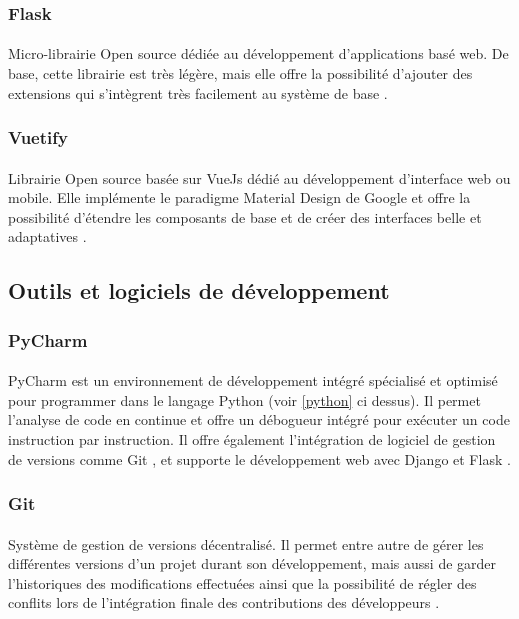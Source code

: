 		\subsubsection*{Flask}
		\paragraph{}
		Micro-librairie Open source dédiée au développement d'applications basé web. De base, cette librairie est très légère, mais elle offre la possibilité d'ajouter des extensions qui s'intègrent très facilement au système de base \cite{flask}.
		
		\subsubsection*{Vuetify}
		\paragraph{}
		Librairie Open source basée sur VueJs dédié au développement d'interface web ou mobile. Elle implémente le paradigme Material Design de Google et offre la possibilité d'étendre les composants de base et de créer des interfaces belle et adaptatives \cite{vuetify}.
	\subsection{Outils et logiciels de développement}
		\subsubsection*{PyCharm}
		\paragraph{}
		PyCharm est un environnement de développement intégré spécialisé et optimisé pour programmer dans le langage Python (voir \ref{python} ci dessus). Il permet l'analyse de code en continue et offre un débogueur intégré pour exécuter un code instruction par instruction. Il offre également l'intégration de logiciel de gestion de versions comme Git \cite{git}, et supporte le développement web avec Django et Flask \cite{pycharm}.
		
		\subsubsection*{Git}
		\paragraph{}
		Système de gestion de versions décentralisé. Il permet entre autre de gérer les différentes versions d'un projet durant son développement, mais aussi de garder l'historiques des modifications effectuées ainsi que la possibilité de régler des conflits lors de l'intégration finale des contributions des développeurs \cite{Git}.
		
